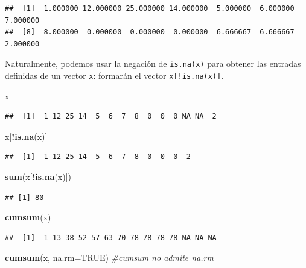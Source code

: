 \documentclass[]{book}
\newenvironment{Shaded}{\begin{snugshade}}{\end{snugshade}}
\newcommand{\CommentTok}[1]{\textcolor[rgb]{0.56,0.35,0.01}{\textit{#1}}}
\newcommand{\DataTypeTok}[1]{\textcolor[rgb]{0.13,0.29,0.53}{#1}}
\newcommand{\KeywordTok}[1]{\textcolor[rgb]{0.13,0.29,0.53}{\textbf{#1}}}
\newcommand{\NormalTok}[1]{#1}
\newcommand{\OperatorTok}[1]{\textcolor[rgb]{0.81,0.36,0.00}{\textbf{#1}}}
\newcommand{\OtherTok}[1]{\textcolor[rgb]{0.56,0.35,0.01}{#1}}
\theoremstyle{definition}
\theoremstyle{definition}
\theoremstyle{definition}
\theoremstyle{remark}
\begin{document}
\begin{verbatim}
##  [1]  1.000000 12.000000 25.000000 14.000000  5.000000  6.000000  7.000000
##  [8]  8.000000  0.000000  0.000000  0.000000  6.666667  6.666667  2.000000
\end{verbatim}

Naturalmente, podemos usar la negación de \texttt{is.na(x)} para obtener las entradas
definidas de un vector \texttt{x}: formarán el vector \texttt{x{[}!is.na(x){]}}.

\begin{Shaded}
\begin{Highlighting}[]
\NormalTok{x}
\end{Highlighting}
\end{Shaded}

\begin{verbatim}
##  [1]  1 12 25 14  5  6  7  8  0  0  0 NA NA  2
\end{verbatim}

\begin{Shaded}
\begin{Highlighting}[]
\NormalTok{x[}\OperatorTok{!}\KeywordTok{is.na}\NormalTok{(x)]}
\end{Highlighting}
\end{Shaded}

\begin{verbatim}
##  [1]  1 12 25 14  5  6  7  8  0  0  0  2
\end{verbatim}

\begin{Shaded}
\begin{Highlighting}[]
\KeywordTok{sum}\NormalTok{(x[}\OperatorTok{!}\KeywordTok{is.na}\NormalTok{(x)])}
\end{Highlighting}
\end{Shaded}

\begin{verbatim}
## [1] 80
\end{verbatim}

\begin{Shaded}
\begin{Highlighting}[]
\KeywordTok{cumsum}\NormalTok{(x)}
\end{Highlighting}
\end{Shaded}

\begin{verbatim}
##  [1]  1 13 38 52 57 63 70 78 78 78 78 NA NA NA
\end{verbatim}

\begin{Shaded}
\begin{Highlighting}[]
\KeywordTok{cumsum}\NormalTok{(x, }\DataTypeTok{na.rm=}\OtherTok{TRUE}\NormalTok{) }\CommentTok{#cumsum no admite na.rm}
\end{Highlighting}
\end{Shaded}
\end{document}
